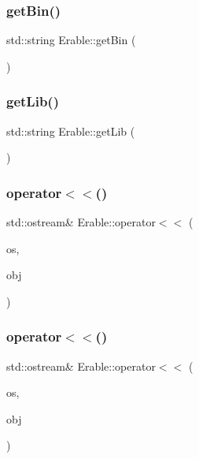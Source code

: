 \subsubsection{\texorpdfstring{getBin()}{getBin()}}
{\footnotesize\ttfamily std\+::string Erable\+::get\+Bin (\begin{DoxyParamCaption}{ }\end{DoxyParamCaption})}

\mbox{\label{namespace_erable_ae9dba4ed847d7fbcf9fc1f437578ef91}} 
\subsubsection{\texorpdfstring{getLib()}{getLib()}}
{\footnotesize\ttfamily std\+::string Erable\+::get\+Lib (\begin{DoxyParamCaption}{ }\end{DoxyParamCaption})}

\mbox{\label{namespace_erable_a248ccc14098f3d28bd8c59ac41eeee0f}} 
\subsubsection{\texorpdfstring{operator$<$$<$()}{operator<<()}\hspace{0.1cm}{\footnotesize\ttfamily [1/2]}}
{\footnotesize\ttfamily std\+::ostream\& Erable\+::operator$<$$<$ (\begin{DoxyParamCaption}\item[{std\+::ostream \&}]{os,  }\item[{\mbox{\hyperlink{class_erable_1_1_constant_pool}{Constant\+Pool}} \&}]{obj }\end{DoxyParamCaption})}

\mbox{\label{namespace_erable_ad7b7bf528e735eaad7f3d472002b1f74}} 
\subsubsection{\texorpdfstring{operator$<$$<$()}{operator<<()}\hspace{0.1cm}{\footnotesize\ttfamily [2/2]}}
{\footnotesize\ttfamily std\+::ostream\& Erable\+::operator$<$$<$ (\begin{DoxyParamCaption}\item[{std\+::ostream \&}]{os,  }\item[{\mbox{\hyperlink{class_erable_1_1_descriptor}{Descriptor}} \&}]{obj }\end{DoxyParamCaption})}

